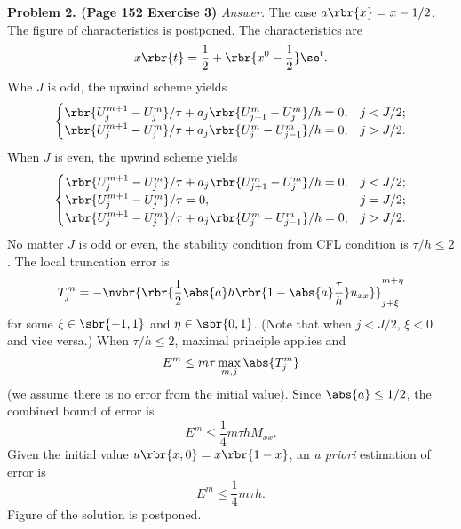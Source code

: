 \documentclass[english, nochinese]{pnote}
\begin{document}
\textbf{Problem 2. (Page 152 Exercise 3)} \textit{Answer.} The case $ a \rbr{x} = x - 1 / 2 $. The figure of characteristics is postponed. The characteristics are
\begin{equation}
x \rbr{t} = \frac{1}{2} + \rbr{ x^0 - \frac{1}{2} } \se^{t}.
\end{equation}
Whe $J$ is odd, the upwind scheme yields
\begin{equation}
\begin{cases}
\rbr{ U_j^{ m + 1 } - U_j^m } / \tau + a_j \rbr{ U_{ j + 1 }^m - U_j^m } / h = 0, & j < J / 2; \\
\rbr{ U_j^{ m + 1 } - U_j^m } / \tau + a_j \rbr{ U_j^m - U_{ j - 1 }^m } / h = 0, & j > J / 2.
\end{cases}
\end{equation}
When $J$ is even, the upwind scheme yields
\begin{equation}
\begin{cases}
\rbr{ U_j^{ m + 1 } - U_j^m } / \tau + a_j \rbr{ U_{ j + 1 }^m - U_j^m } / h = 0, & j < J / 2; \\
\rbr{ U_j^{ m + 1 } - U_j^m } / \tau = 0, & j = J / 2; \\
\rbr{ U_j^{ m + 1 } - U_j^m } / \tau + a_j \rbr{ U_j^m - U_{ j - 1 }^m } / h = 0, & j > J / 2.
\end{cases}
\end{equation}
No matter $J$ is odd or even, the stability condition from CFL condition is $ \tau / h \le 2 $.
The local truncation error is
\begin{equation}
T_j^m = - \nvbr{\rbr{ \frac{1}{2} \abs{a} h \rbr{ 1 - \abs{a} \frac{\tau}{h} } u_{ x x } }}_{ j + \xi }^{ m + \eta }
\end{equation}
for some $ \xi \in \sbr{ -1, 1 } $ and $ \eta \in \sbr{ 0, 1 } $. (Note that when $ j < J / 2 $, $ \xi < 0 $ and vice versa.)
When $ \tau / h \le 2 $, maximal principle applies and
\begin{equation}
E^m \le m \tau \max_{ m, j } \abs{T_j^m}
\end{equation}
(we assume there is no error from the initial value). Since $ \abs{a} \le 1 / 2 $, the combined bound of error is
\begin{equation}
E^m \le \frac{1}{4} m \tau h M_{ x x }.
\end{equation}
Given the initial value $ u \rbr{ x, 0 } = x \rbr{ 1 - x } $, an \textit{a priori} estimation of error is
\begin{equation}
E^m \le \frac{1}{4} m \tau h.
\end{equation}
Figure of the solution is postponed.
\end{document}
